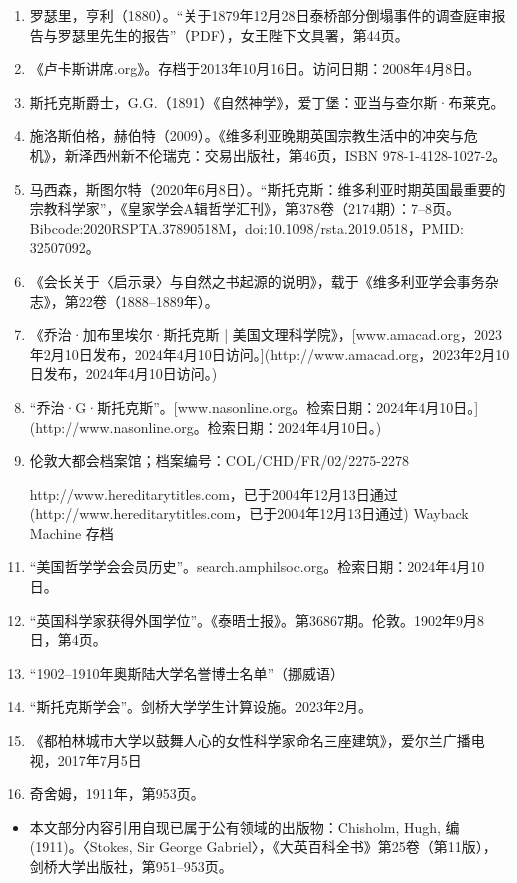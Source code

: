 \begin{enumerate}
\item 罗瑟里，亨利（1880）。“关于1879年12月28日泰桥部分倒塌事件的调查庭审报告与罗瑟里先生的报告”（PDF），女王陛下文具署，第44页。
\item 《卢卡斯讲席.org》。存档于2013年10月16日。访问日期：2008年4月8日。
\item 斯托克斯爵士，G.G.（1891）《自然神学》，爱丁堡：亚当与查尔斯·布莱克。
\item 施洛斯伯格，赫伯特（2009）。《维多利亚晚期英国宗教生活中的冲突与危机》，新泽西州新不伦瑞克：交易出版社，第46页，ISBN 978-1-4128-1027-2。
\item 马西森，斯图尔特（2020年6月8日）。“斯托克斯：维多利亚时期英国最重要的宗教科学家”，《皇家学会A辑哲学汇刊》，第378卷（2174期）：7–8页。Bibcode:2020RSPTA.37890518M，doi:10.1098/rsta.2019.0518，PMID: 32507092。
\item 《会长关于〈启示录〉与自然之书起源的说明》，载于《维多利亚学会事务杂志》，第22卷（1888–1889年）。
\item 《乔治·加布里埃尔·斯托克斯 | 美国文理科学院》，[www.amacad.org，2023年2月10日发布，2024年4月10日访问。](http://www.amacad.org，2023年2月10日发布，2024年4月10日访问。)
\item  “乔治·G·斯托克斯”。[www.nasonline.org。检索日期：2024年4月10日。](http://www.nasonline.org。检索日期：2024年4月10日。)
\item 伦敦大都会档案馆；档案编号：COL/CHD/FR/02/2275-2278
\item [http://www.hereditarytitles.com，已于2004年12月13日通过](http://www.hereditarytitles.com，已于2004年12月13日通过) Wayback Machine 存档
\item “美国哲学学会会员历史”。search.amphilsoc.org。检索日期：2024年4月10日。
\item “英国科学家获得外国学位”。《泰晤士报》。第36867期。伦敦。1902年9月8日，第4页。
\item “1902–1910年奥斯陆大学名誉博士名单”（挪威语）
\item “斯托克斯学会”。剑桥大学学生计算设施。2023年2月。
\item 《都柏林城市大学以鼓舞人心的女性科学家命名三座建筑》，爱尔兰广播电视，2017年7月5日
\item 奇舍姆，1911年，第953页。
\end{enumerate}
\begin{itemize}
\item 本文部分内容引用自现已属于公有领域的出版物：Chisholm, Hugh, 编 (1911)。〈Stokes, Sir George Gabriel〉，《大英百科全书》第25卷（第11版），剑桥大学出版社，第951–953页。
\end{itemize}
